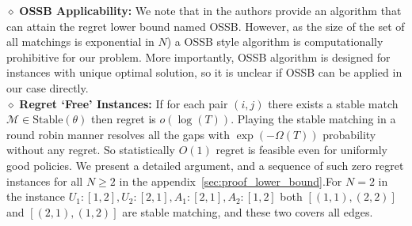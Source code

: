 \documentclass{article}
\begin{document}
$\diamond\,\,$\textbf{OSSB Applicability:} We note that in \cite{combes2015combinatorial}  the authors provide an algorithm that can attain the regret lower bound named OSSB. However, as the size of the set of all matchings is exponential in $N$) a OSSB style algorithm is computationally prohibitive for our problem. More importantly, OSSB algorithm is designed for instances with unique optimal solution, so it is unclear if OSSB can be applied in our case directly.
\\$\diamond\,\,$\textbf{Regret `Free' Instances:} If for each pair $(i,j)$ there exists a stable match $\mathcal{M} \in \mathrm{Stable}(\theta)$ then regret is $o(\log(T))$. Playing the stable matching in a round robin manner resolves all the gaps with $\exp(-\Omega(T))$ probability without any regret. So statistically $O(1)$ regret is feasible even for uniformly good policies. We present a detailed argument, and a sequence of such zero regret instances for all $N \geq 2$ in the appendix~\ref{sec:proof_lower_bound}.For $N=2$ in the instance $U_1: [1,2], U_2: [2,1], A_1: [2, 1], A_2: [1, 2]$ both $[(1,1), (2,2)]$ and $[(2,1), (1,2)]$  are stable matching, and these two covers all edges.  
\end{document}
